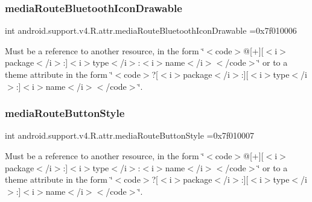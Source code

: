 \subsubsection{\texorpdfstring{media\+Route\+Bluetooth\+Icon\+Drawable}{mediaRouteBluetoothIconDrawable}}
{\footnotesize\ttfamily int android.\+support.\+v4.\+R.\+attr.\+media\+Route\+Bluetooth\+Icon\+Drawable =0x7f010006\hspace{0.3cm}{\ttfamily [static]}}

Must be a reference to another resource, in the form \char`\"{}$<$code$>$@\mbox{[}+\mbox{]}\mbox{[}$<$i$>$package$<$/i$>$\+:\mbox{]}$<$i$>$type$<$/i$>$\+:$<$i$>$name$<$/i$>$$<$/code$>$\char`\"{} or to a theme attribute in the form \char`\"{}$<$code$>$?\mbox{[}$<$i$>$package$<$/i$>$\+:\mbox{]}\mbox{[}$<$i$>$type$<$/i$>$\+:\mbox{]}$<$i$>$name$<$/i$>$$<$/code$>$\char`\"{}. \mbox{\label{classandroid_1_1support_1_1v4_1_1R_1_1attr_aa431219497981e8dea0e2c656ef265e0}} 
\subsubsection{\texorpdfstring{media\+Route\+Button\+Style}{mediaRouteButtonStyle}}
{\footnotesize\ttfamily int android.\+support.\+v4.\+R.\+attr.\+media\+Route\+Button\+Style =0x7f010007\hspace{0.3cm}{\ttfamily [static]}}

Must be a reference to another resource, in the form \char`\"{}$<$code$>$@\mbox{[}+\mbox{]}\mbox{[}$<$i$>$package$<$/i$>$\+:\mbox{]}$<$i$>$type$<$/i$>$\+:$<$i$>$name$<$/i$>$$<$/code$>$\char`\"{} or to a theme attribute in the form \char`\"{}$<$code$>$?\mbox{[}$<$i$>$package$<$/i$>$\+:\mbox{]}\mbox{[}$<$i$>$type$<$/i$>$\+:\mbox{]}$<$i$>$name$<$/i$>$$<$/code$>$\char`\"{}. \mbox{\label{classandroid_1_1support_1_1v4_1_1R_1_1attr_a1baa7615b19696344c56706d077140f8}} 
